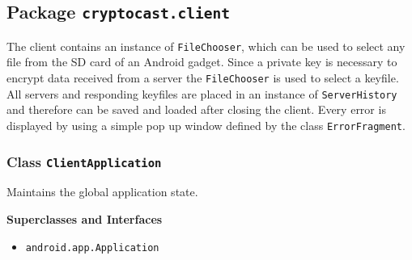 \subsection{Package \lstinline!cryptocast.client!}
The client contains an instance of \lstinline|FileChooser|, which can be used to select any file from the SD card 
 of an Android gadget. Since a private key is necessary to encrypt data received from a server the 
 \lstinline|FileChooser| is used to select a keyfile. All servers and responding keyfiles are placed 
 in an instance of \lstinline|ServerHistory| and therefore can be saved and loaded after closing the client.
 Every error is displayed by using a simple pop up window defined by the class \lstinline|ErrorFragment|.

\subsubsection{Class \lstinline|ClientApplication|}
Maintains the global application state. \\
\noindent\begin{minipage}[t]{5cm}
\vspace{0.3em}
\hspace*{2em}
\vspace{0.3em}
\end{minipage}



\textbf{\sffamily Superclasses and Interfaces}
\begin{itemize}
\item \lstinline|android.app.Application|
\end{itemize}



